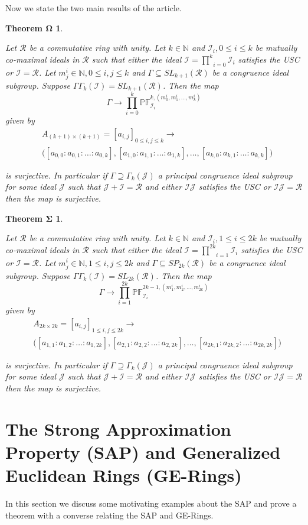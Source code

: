\documentclass[12pt]{amsart}
\makeatletter
\newcommand{\Gs}{\Sigma}
\newcommand{\Gom}{\Omega}
\newcommand{\mbb}{\mathbb}
\newcommand{\mcl}{\mathcal}
\newcommand{\us}{\underset}
\newcommand{\os}{\overset}
\newcommand{\lra}{\longrightarrow}
\newcommand{\I}{\mcl I}
\newcommand{\R}{\mcl R}
\newcommand{\equ}[1]{%
\begin{equation*}
#1
\end{equation*}
}
\newcommand{\equa}[1]{%
\begin{equation*}
\begin{aligned}
#1
\end{aligned}
\end{equation*}
}
\theoremstyle{plain}
\def\namedlabel#1#2{\begingroup
	\def\@currentlabel{#2}%
	\label{#1}\endgroup
}
\newtheorem*{thmOmega}{\bf{Theorem} $\bm{\Gom}$}
\newtheorem*{thmSigma}{\bf{Theorem} $\bm{\Gs}$}
\theoremstyle{definition}
\theoremstyle{remark}
\numberwithin{equation}{section}
\makeatother
\begin{document}
Now we state the two main results of the article.
\begin{thmOmega}
	\namedlabel{theorem:FullGenSurjOne}{$\Gom$}
Let $\R$ be a commutative ring with unity. 
Let $k\in \mbb{N}$ and $\mcl{I}_i,0\leq i\leq k$ be mutually co-maximal ideals in $\R$ such that either the ideal $\mcl{I}=\us{i=0}{\os{k}{\prod}}\mcl{I}_i$ satisfies the USC or $\mcl{I}=\R$. Let $m_j^i\in \mbb{N}, 0\leq i,j\leq k$ and $\Gamma \subseteq SL_{k+1}(\R)$ be a congruence ideal subgroup. Suppose  $\Gamma\Gamma_k(\I)=SL_{k+1}(\R)$. 
Then the map 
\equ{\Gamma \lra \us{i=0}{\os{k}{\prod}}\mbb{PF}^{k,(m^i_0,m^i_1,\ldots,m^i_k)}_{\I_i}} given by
\equa{&A_{(k+1)\times (k+1)}=[a_{i,j}]_{0\leq i,j\leq k} \lra\\
	&\big([a_{0,0}:a_{0,1}:\ldots: a_{0,k}],[a_{1,0}:a_{1,1}:\ldots: a_{1,k}],\ldots,[a_{k,0}:a_{k,1}:\ldots: a_{k,k}]\big)}
is surjective. In particular if $\Gamma\supseteq \Gamma_k(\mcl{J})$ a principal congruence ideal subgroup for some ideal $\mcl{J}$ such that $\mcl{J}+\mcl{I}=\R$ and either $\I\mcl{J}$ satisfies the USC or $\I\mcl{J}=\R$ then the map is surjective.
\end{thmOmega}
\begin{thmSigma}
	\namedlabel{theorem:FullGenSurjOneSP}{$\Gs$}
	Let $\R$ be a commutative ring with unity. 
	Let $k\in \mbb{N}$ and $\mcl{I}_i,1\leq i\leq 2k$ be mutually co-maximal ideals in $\R$ such that either the ideal $\mcl{I}=\us{i=1}{\os{2k}{\prod}}\mcl{I}_i$ satisfies the USC or $\mcl{I}=\R$.
	Let $m_j^i\in \mbb{N}, 1\leq i,j\leq 2k$ and $\Gamma \subseteq SP_{2k}(\R)$ be a congruence ideal subgroup. Suppose  $\Gamma\Gamma_k(\I)=SL_{2k}(\R)$.  
	Then the map 
	\equ{\Gamma \lra \us{i=1}{\os{2k}{\prod}}\mbb{PF}^{2k-1,(m^i_1,m^i_2,\ldots,m^i_{2k})}_{\I_i}} given by
	\equa{&A_{2k\times 2k}=[a_{i,j}]_{1\leq i,j\leq 2k} \lra\\
		&\big([a_{1,1}:a_{1,2}:\ldots: a_{1,2k}],[a_{2,1}:a_{2,2}:\ldots: a_{2,2k}],\ldots,[a_{2k,1}:a_{2k,2}:\ldots: a_{2k,2k}]\big)}
	is surjective. In particular if $\Gamma\supseteq \Gamma_k(\mcl{J})$ a principal congruence ideal subgroup for some ideal $\mcl{J}$ such that $\mcl{J}+\mcl{I}=\R$ and either $\I\mcl{J}$ satisfies the USC or $\I\mcl{J}=\R$ then the map is surjective.
\end{thmSigma}

\section{\bf{The Strong Approximation Property (SAP) and Generalized Euclidean Rings (GE-Rings)}}
\label{sec:SAP}
In this section we discuss some motivating examples about the SAP and prove a theorem with a converse relating the SAP and GE-Rings.
\end{document}

